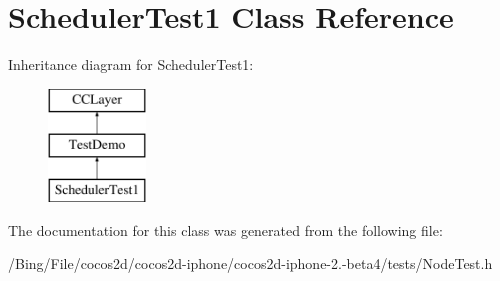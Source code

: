 \hypertarget{interface_scheduler_test1}{\section{Scheduler\-Test1 Class Reference}
\label{interface_scheduler_test1}
}
Inheritance diagram for Scheduler\-Test1\-:\begin{figure}[H]
\begin{center}
\leavevmode
\includegraphics[height=3.000000cm]{interface_scheduler_test1}
\end{center}
\end{figure}


The documentation for this class was generated from the following file\-:\begin{DoxyCompactItemize}
\item 
/\-Bing/\-File/cocos2d/cocos2d-\/iphone/cocos2d-\/iphone-\/2.-\/beta4/tests/Node\-Test.\-h\end{DoxyCompactItemize}
